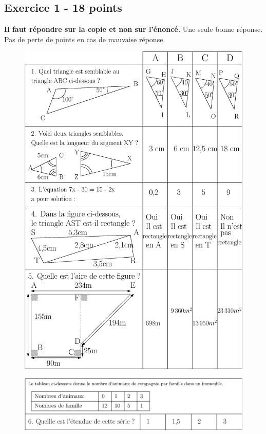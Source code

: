 \begin{titlepage}
    \vfill 
    
    \end{titlepage}
    
\newpage
\setcounter{page}{2}
\subsection*{Exercice 1 - 18 points }
\textbf{Il faut répondre sur la copie et non sur l'énoncé.} Une seule bonne réponse. Pas de perte de points en cas de mauvaise réponse. 

\begin{figure}[H]
  \centering
  \includegraphics[width=0.8\linewidth]{qcm1-full-1.eps}
\end{figure}
\begin{figure}[H]
  \centering
  \includegraphics[width=0.8\linewidth]{qcm1-full-2.eps}
\end{figure}


